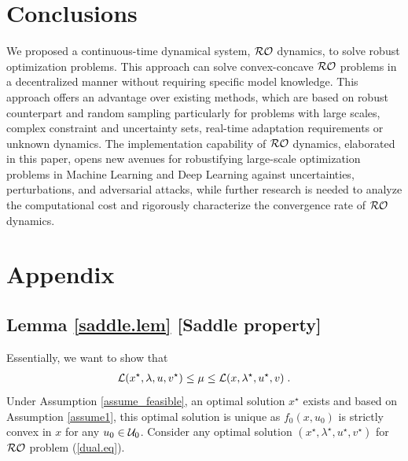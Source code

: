\documentclass[journal,twoside,web]{ieeecolor}
\begin{document}
\section{Conclusions}\label{section_conclusions}
We proposed a continuous-time dynamical system, ${\cal RO}$ dynamics, to solve robust optimization problems. This approach can solve convex-concave ${\cal RO}$ problems in a decentralized manner without requiring specific model knowledge. This approach offers an advantage over existing methods, which are based on robust counterpart and random sampling particularly for problems with large scales, complex constraint and uncertainty sets, real-time adaptation requirements or unknown dynamics. The implementation capability of ${\cal RO}$ dynamics, elaborated in this paper, opens new avenues for robustifying large-scale optimization problems in Machine Learning and Deep Learning against uncertainties, perturbations, and adversarial attacks, while further research is needed to analyze the computational cost and rigorously characterize the convergence rate of ${\cal RO}$ dynamics.
\section{Appendix} \label{section_appendix}

\subsection{Lemma \ref{saddle.lem} [Saddle property]}
Essentially, we want to show that
\begin{align*}
{\cal L}(x^\star,\lambda,u,v^\star)\leq \mu \leq {\cal L}(x,\lambda^\star,u^\star,v)\;.
\end{align*}
Under Assumption \ref{assume_feasible}, an optimal solution $x^\star$ exists and based on Assumption \ref{assume1}, this optimal solution is unique as $f_0(x,u_0)$ is strictly convex in $x$ for any $u_0 \in{\cal U}_0$. Consider any optimal solution $(x^\star,\lambda^\star,u^\star,v^\star)$ for ${\cal RO}$ problem (\ref{dual.eq}).
\end{document}
